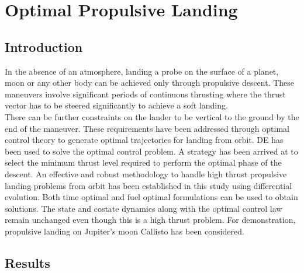 
\chapter{Optimal Propulsive Landing}
\label{app2}
\ifpdf
\graphicspath{{Appendix2/}{Appendix2/}{Appendix2/}}
\else
\graphicspath{{Appendix2/}{Appendix2/}}
\fi


\section{Introduction}
In the absence of an atmosphere, landing a probe on the surface of a planet, moon or any other body can be achieved only through propulsive descent. These maneuvers involve significant periods of continuous thrusting where the thrust vector has to be steered significantly to achieve a soft landing.\\
There can be further constraints on the lander to be vertical to the ground by the end of the maneuver. These requirements have been addressed through optimal control theory to generate optimal trajectories for landing from orbit. DE has
been used to solve the optimal control problem. A strategy has been arrived at to select the minimum thrust level required to perform the optimal phase of the descent. An effective and robust methodology to handle high thrust propulsive landing problems from orbit has been established in this study using differential
evolution. Both time optimal and fuel optimal formulations can be used to obtain solutions. The state and costate dynamics along with the optimal control law remain unchanged even though this is a high thrust problem. For demonstration, propulsive landing on Jupiter's moon Callisto has been considered.
\section{Results}
